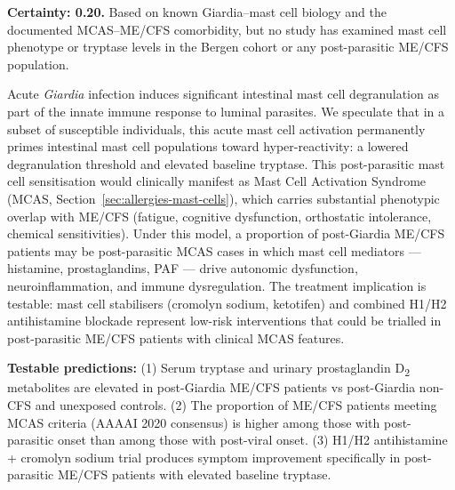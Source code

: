 \begin{speculation}
\label{spec:parasite-mcas-priming}
\textbf{Certainty: 0.20.} Based on known Giardia--mast cell biology and the documented MCAS--ME/CFS comorbidity, but no study has examined mast cell phenotype or tryptase levels in the Bergen cohort or any post-parasitic ME/CFS population.

Acute \emph{Giardia} infection induces significant intestinal mast cell degranulation as part of the innate immune response to luminal parasites. We speculate that in a subset of susceptible individuals, this acute mast cell activation permanently primes intestinal mast cell populations toward hyper-reactivity: a lowered degranulation threshold and elevated baseline tryptase. This post-parasitic mast cell sensitisation would clinically manifest as Mast Cell Activation Syndrome (MCAS, Section~\ref{sec:allergies-mast-cells}), which carries substantial phenotypic overlap with ME/CFS (fatigue, cognitive dysfunction, orthostatic intolerance, chemical sensitivities). Under this model, a proportion of post-Giardia ME/CFS patients may be post-parasitic MCAS cases in which mast cell mediators --- histamine, prostaglandins, PAF --- drive autonomic dysfunction, neuroinflammation, and immune dysregulation. The treatment implication is testable: mast cell stabilisers (cromolyn sodium, ketotifen) and combined H1/H2 antihistamine blockade represent low-risk interventions that could be trialled in post-parasitic ME/CFS patients with clinical MCAS features.

\textbf{Testable predictions:} (1) Serum tryptase and urinary prostaglandin D\textsubscript{2} metabolites are elevated in post-Giardia ME/CFS patients vs post-Giardia non-CFS and unexposed controls. (2) The proportion of ME/CFS patients meeting MCAS criteria (AAAAI 2020 consensus) is higher among those with post-parasitic onset than among those with post-viral onset. (3) H1/H2 antihistamine + cromolyn sodium trial produces symptom improvement specifically in post-parasitic ME/CFS patients with elevated baseline tryptase.
\end{speculation}

